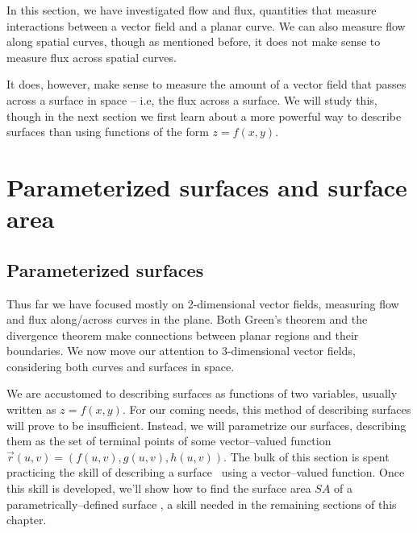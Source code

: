In this section, we have investigated flow and flux, quantities that measure interactions between a vector field and a planar curve. We can also measure flow along spatial curves, though as mentioned before, it does not make sense to measure flux across spatial curves.

It does, however, make sense to measure the amount of a vector field that passes across a surface in space -- i.e, the flux across a surface. We will study this, though in the next section we first  learn about a more powerful way to describe surfaces than using functions of the form $z=f(x,y)$.



\section{Parameterized surfaces and surface area}\label{sec:paramatric_surf_area}
\subsection{Parameterized surfaces}
\label{sec:parametric_surfaces}

	\checkoddpage
{}
Thus far we have focused mostly on 2-dimensional vector fields, measuring flow and flux along/across curves in the plane. Both Green's theorem and the divergence theorem make connections between planar regions and their boundaries. We now move our attention to 3-dimensional vector fields, considering both curves and surfaces in space.

We are accustomed to describing surfaces as functions of two variables, usually written as $z=f(x,y)$. For our coming needs, this method of describing surfaces will prove to be insufficient. Instead, we will parametrize our surfaces, describing them as the set of terminal points of some vector--valued function $\vec r(u,v) =\left( f(u,v),g(u,v),h(u,v)\right)$. The bulk of this section is spent practicing the skill of describing a surface \surfaceS\ using a vector--valued function. Once this skill is developed, we'll show how to find the surface area $SA$ of a parametrically--defined surface \surfaceS, a skill needed in the remaining sections of this chapter.

